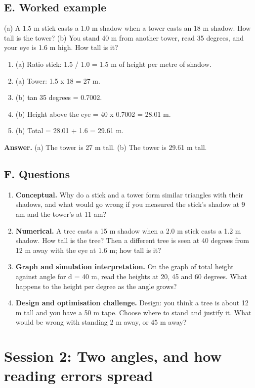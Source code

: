 \documentclass[11pt,a4paper]{article}
\begin{document}
\subsection*{E. Worked example}
(a) A 1.5 m stick casts a 1.0 m shadow when a tower casts an 18 m shadow. How tall is the tower? (b) You stand 40 m from another tower, read 35 degrees, and your eye is 1.6 m high. How tall is it?
\begin{enumerate}[nosep]
\item (a) Ratio stick: 1.5 / 1.0 = 1.5 m of height per metre of shadow.
\item (a) Tower: 1.5 x 18 = 27 m.
\item (b) tan 35 degrees = 0.7002.
\item (b) Height above the eye = 40 x 0.7002 = 28.01 m.
\item (b) Total = 28.01 + 1.6 = 29.61 m.
\end{enumerate}
\textbf{Answer.} (a) The tower is 27 m tall. (b) The tower is 29.61 m tall.

\subsection*{F. Questions}
\begin{enumerate}[nosep]
\item \textbf{Conceptual.} Why do a stick and a tower form similar triangles with their shadows, and what would go wrong if you measured the stick's shadow at 9 am and the tower's at 11 am?
\item \textbf{Numerical.} A tree casts a 15 m shadow when a 2.0 m stick casts a 1.2 m shadow. How tall is the tree? Then a different tree is seen at 40 degrees from 12 m away with the eye at 1.6 m; how tall is it?
\item \textbf{Graph and simulation interpretation.} On the graph of total height against angle for d = 40 m, read the heights at 20, 45 and 60 degrees. What happens to the height per degree as the angle grows?
\item \textbf{Design and optimisation challenge.} Design: you think a tree is about 12 m tall and you have a 50 m tape. Choose where to stand and justify it. What would be wrong with standing 2 m away, or 45 m away?
\end{enumerate}

\section{Session 2: Two angles, and how reading errors spread}
\end{document}
